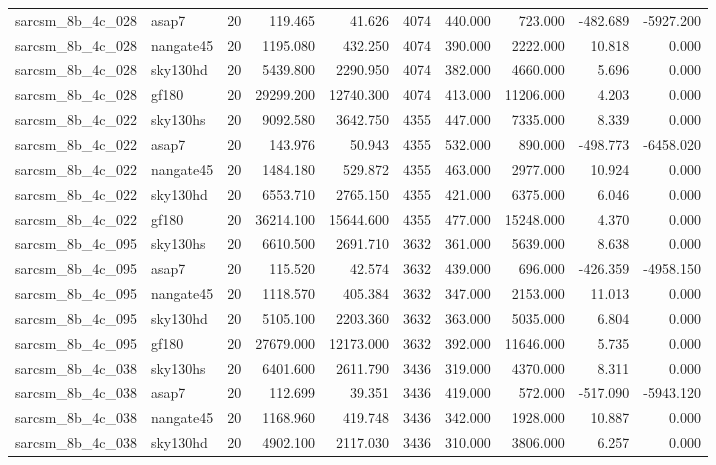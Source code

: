 \begin{longtable}{llrrrrrrrr}
sarcsm\_8b\_4c\_028 & asap7 & 20 & 119.465 & 41.626 & 4074 & 440.000 & 723.000 & -482.689 & -5927.200 \\
sarcsm\_8b\_4c\_028 & nangate45 & 20 & 1195.080 & 432.250 & 4074 & 390.000 & 2222.000 & 10.818 & 0.000 \\
sarcsm\_8b\_4c\_028 & sky130hd & 20 & 5439.800 & 2290.950 & 4074 & 382.000 & 4660.000 & 5.696 & 0.000 \\
sarcsm\_8b\_4c\_028 & gf180 & 20 & 29299.200 & 12740.300 & 4074 & 413.000 & 11206.000 & 4.203 & 0.000 \\
sarcsm\_8b\_4c\_022 & sky130hs & 20 & 9092.580 & 3642.750 & 4355 & 447.000 & 7335.000 & 8.339 & 0.000 \\
sarcsm\_8b\_4c\_022 & asap7 & 20 & 143.976 & 50.943 & 4355 & 532.000 & 890.000 & -498.773 & -6458.020 \\
sarcsm\_8b\_4c\_022 & nangate45 & 20 & 1484.180 & 529.872 & 4355 & 463.000 & 2977.000 & 10.924 & 0.000 \\
sarcsm\_8b\_4c\_022 & sky130hd & 20 & 6553.710 & 2765.150 & 4355 & 421.000 & 6375.000 & 6.046 & 0.000 \\
sarcsm\_8b\_4c\_022 & gf180 & 20 & 36214.100 & 15644.600 & 4355 & 477.000 & 15248.000 & 4.370 & 0.000 \\
sarcsm\_8b\_4c\_095 & sky130hs & 20 & 6610.500 & 2691.710 & 3632 & 361.000 & 5639.000 & 8.638 & 0.000 \\
sarcsm\_8b\_4c\_095 & asap7 & 20 & 115.520 & 42.574 & 3632 & 439.000 & 696.000 & -426.359 & -4958.150 \\
sarcsm\_8b\_4c\_095 & nangate45 & 20 & 1118.570 & 405.384 & 3632 & 347.000 & 2153.000 & 11.013 & 0.000 \\
sarcsm\_8b\_4c\_095 & sky130hd & 20 & 5105.100 & 2203.360 & 3632 & 363.000 & 5035.000 & 6.804 & 0.000 \\
sarcsm\_8b\_4c\_095 & gf180 & 20 & 27679.000 & 12173.000 & 3632 & 392.000 & 11646.000 & 5.735 & 0.000 \\
sarcsm\_8b\_4c\_038 & sky130hs & 20 & 6401.600 & 2611.790 & 3436 & 319.000 & 4370.000 & 8.311 & 0.000 \\
sarcsm\_8b\_4c\_038 & asap7 & 20 & 112.699 & 39.351 & 3436 & 419.000 & 572.000 & -517.090 & -5943.120 \\
sarcsm\_8b\_4c\_038 & nangate45 & 20 & 1168.960 & 419.748 & 3436 & 342.000 & 1928.000 & 10.887 & 0.000 \\
sarcsm\_8b\_4c\_038 & sky130hd & 20 & 4902.100 & 2117.030 & 3436 & 310.000 & 3806.000 & 6.257 & 0.000 \\

\end{longtable}
